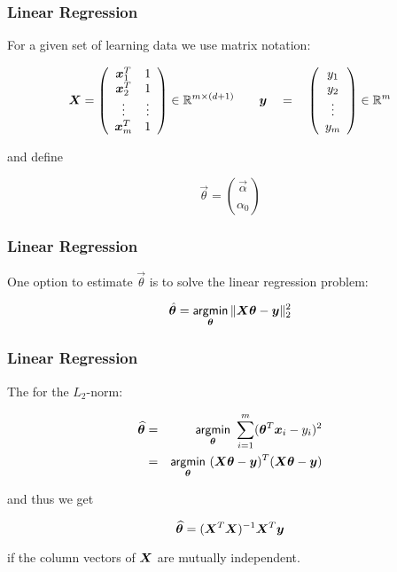 \begin{frame}
	\frametitle{Linear Regression \cont}

	For a given set of learning data we use matrix notation:

	\begin{displaymath}
		{\bm X} = \left(
		\begin{array}{cc}
				{\bm x}_1^T & 1      \\
				{\bm x}_2^T & 1      \\
				\vdots     & \vdots \\
				{\bm x}_m^T & 1
			\end{array}
		\right) \in \mathbb{R}^{m\times (d+1)} \qquad {\bm y} \quad = \quad
		\left(
		\begin{array}{c}
				y_1    \\
				y_2    \\
				\vdots \\
				y_m    \\
			\end{array}
		\right) \in \mathbb{R}^m
	\end{displaymath}

	and define

	\begin{displaymath}
		\vec \theta = { \vec \alpha\choose \alpha_0}
	\end{displaymath}
\end{frame}


\begin{frame}
	\frametitle{Linear Regression \cont}

	One option to estimate $\vec \theta$ is to solve the linear regression problem:

	\begin{displaymath}
		\hat{{\bm \theta}} = \mathop{\mathsf{argmin}}_{{\bm \theta}}\| {\bm X} {\bm \theta} - {\bm y}\|_{2}^2
	\end{displaymath}
\end{frame}


\begin{frame}
	\frametitle{Linear Regression \cont}

	The  for the $L_2$-norm:

	\begin{eqnarray*}
		\widehat{\vec \theta} &=& \argmin_{\vec\theta} \ \sum_{i=1}^m (\vec \theta^T\vec x_i-y_i)^2\\
		&=& \argmin_{\vec\theta} \ (\mat{X}\vec \theta-\vec y)^T(\mat{X}\vec \theta-\vec y)
	\end{eqnarray*}
	\pause

	and thus we get

	\begin{displaymath}
		\widehat{{\bm \theta}} = ({\bm X}^T{\bm X})^{-1}{\bm X}^T{\bm y}
	\end{displaymath}

	if the column vectors of ${\bm X}$ are mutually independent.
\end{frame}


